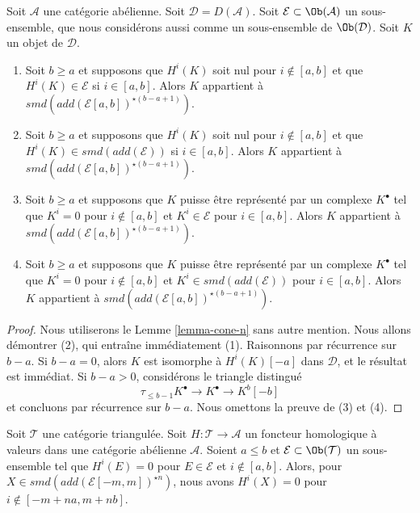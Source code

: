 \begin{lemma}
\label{lemma-in-cone-n}
Soit $\mathcal{A}$ une catégorie abélienne. Soit
$\mathcal{D} = D(\mathcal{A})$.
Soit $\mathcal{E} \subset \Ob(\mathcal{A})$ un sous-ensemble, que nous
considérons aussi comme un sous-ensemble de $\Ob(\mathcal{D})$.
Soit $K$ un objet de $\mathcal{D}$.
\begin{enumerate}
\item Soit $b \geq a$ et supposons que $H^i(K)$ soit nul pour
$i \not \in [a, b]$ et que $H^i(K) \in \mathcal{E}$ si
$i \in [a, b]$. Alors $K$ appartient à
$smd(add(\mathcal{E}[a, b])^{\star (b - a + 1)})$.
\item Soit $b \geq a$ et supposons que $H^i(K)$ soit nul pour
$i \not \in [a, b]$ et que $H^i(K) \in smd(add(\mathcal{E}))$ si
$i \in [a, b]$. Alors $K$ appartient à
$smd(add(\mathcal{E}[a, b])^{\star (b - a + 1)})$.
\item Soit $b \geq a$ et supposons que $K$ puisse être représenté par un
complexe $K^\bullet$ tel que $K^i = 0$ pour $i \not \in [a, b]$ et
$K^i \in \mathcal{E}$ pour $i \in [a, b]$. Alors $K$ appartient à
$smd(add(\mathcal{E}[a, b])^{\star (b - a + 1)})$.
\item Soit $b \geq a$ et supposons que $K$ puisse être représenté par un
complexe $K^\bullet$ tel que $K^i = 0$ pour $i \not \in [a, b]$ et
$K^i \in smd(add(\mathcal{E}))$ pour $i \in [a, b]$. Alors $K$ appartient à
$smd(add(\mathcal{E}[a, b])^{\star (b - a + 1)})$.
\end{enumerate}
\end{lemma}

\begin{proof}
Nous utiliserons le Lemme \ref{lemma-cone-n} sans autre mention.
Nous allons démontrer (2), qui entraîne immédiatement (1). Raisonnons par
récurrence sur $b - a$. Si $b - a = 0$, alors $K$ est isomorphe à
$H^i(K)[-a]$ dans $\mathcal{D}$, et le résultat est immédiat.
Si $b - a > 0$, considérons le triangle distingué
$$
\tau_{\leq b - 1}K^\bullet \to K^\bullet \to K^b[-b]
$$
et concluons par récurrence sur $b - a$. Nous omettons la preuve de (3) et
(4).
\end{proof}

\begin{lemma}
\label{lemma-forward-cone-n}
Soit $\mathcal{T}$ une catégorie triangulée. Soit
$H : \mathcal{T} \to \mathcal{A}$ un foncteur homologique à valeurs dans une
catégorie abélienne $\mathcal{A}$.
Soient $a \leq b$ et $\mathcal{E} \subset \Ob(\mathcal{T})$ un sous-ensemble
tel que $H^i(E) = 0$ pour $E \in \mathcal{E}$ et $i \not \in [a, b]$.
Alors, pour $X \in smd(add(\mathcal{E}[-m, m])^{\star n})$, nous avons
$H^i(X) = 0$ pour $i \not \in [-m + na, m + nb]$.
\end{lemma}

